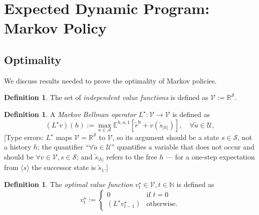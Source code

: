 \documentclass[letterpaper]{article}
\theoremstyle{plain}
\theoremstyle{definition}
\newtheorem{definition}[theorem]{Definition}
\theoremstyle{remark}
\newcommand{\Nats}{\mathbb{N}}
\newcommand{\Real}{\mathbb{R}}
\newcommand{\E}{\mathbb{E}}
\newcommand{\opt}{^{\star}}
\newcommand{\rew}{\tilde{r}^{\mathrm{h}}}
\newcommand{\cc}[1]{\textcolor{ccolor}{[#1]}}
\newcommand{\lean}[1]{\textcolor{blue}{(\emph{LEAN}: \texttt{#1})}}
\newcommand{\leanok}{}
\begin{document}
\section{Expected Dynamic Program: Markov Policy}

\subsection{Optimality}
We discuss results needed to prove the optimality of Markov policies. 

\begin{definition} \label{def:Values}
  The set of \emph{independent value functions} is defined as $\mathcal{V} := \Real^{\mathcal{S}}$.
\end{definition}

\begin{definition}\label{def:DPMopt}
A \emph{Markov Bellman operator} $L\opt\colon \mathcal{V} \to \mathcal{V}$ is defined as
\[
(L\opt  v)(h)  :=
\max_{a\in \mathcal{A}} \E^{h, a, 1} \left[ \rew + v(\tilde{s}_{|h|}) \right], \quad \forall \tilde{u} \in \mathcal{U},
\]
\cc{Type errors: $L\opt$ maps $\mathcal{V}=\Real^{\mathcal{S}}$ to $\mathcal{V}$, so its argument should be a state $s\in \mathcal{S}$, not a history $h$; the quantifier ``$\forall \tilde{u}\in \mathcal{U}$'' quantifies a variable that does not occur and should be $\forall v\in \mathcal{V}, s\in \mathcal{S}$; and $\tilde{s}_{|h|}$ refers to the free $h$ --- for a one-step expectation from $\langle s\rangle$ the successor state is $\tilde{s}_1$.}
\end{definition}

\begin{definition} \label{def:v-dp-opt}
The \emph{optimal value function} $v\opt_t\in \mathcal{V}, t\in \Nats$ is defined as
\[
v\opt_t := 
\begin{cases}
    0 &\text{if } t = 0 \\
    (L\opt  v\opt _{t-1}) &\text{otherwise}.
\end{cases}
\]
\end{definition}
\end{document}
